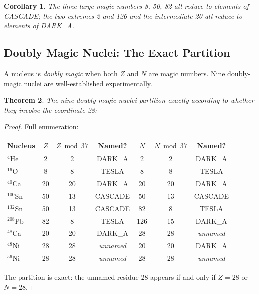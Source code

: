 \documentclass[11pt]{article}
\newtheorem{theorem}{Theorem}
\newtheorem{corollary}[theorem]{Corollary}
\theoremstyle{remark}
\begin{document}
\begin{corollary}
The three large magic numbers 8, 50, 82 all reduce to elements of CASCADE; the
two extremes 2 and 126 and the intermediate 20 all reduce to elements of DARK\_A.
\end{corollary}

\subsection{Doubly Magic Nuclei: The Exact Partition}

A nucleus is \emph{doubly magic} when both $Z$ and $N$ are magic numbers.
Nine doubly-magic nuclei are well-established experimentally.

\begin{theorem}
The nine doubly-magic nuclei partition exactly according to whether they involve
the coordinate 28:
\end{theorem}

\begin{proof}
Full enumeration:
\begin{center}
\begin{tabular}{lcccccc}
\toprule
Nucleus & $Z$ & $Z$ & Named? & $N$ & $N$ & Named?\\
\midrule
${}^{4}$He  & 2  & 2  & DARK\_A & 2   & 2  & DARK\_A \\
${}^{16}$O  & 8  & 8  & TESLA   & 8   & 8  & TESLA   \\
${}^{40}$Ca & 20 & 20 & DARK\_A & 20  & 20 & DARK\_A \\
${}^{100}$Sn& 50 & 13 & CASCADE & 50  & 13 & CASCADE \\
${}^{132}$Sn& 50 & 13 & CASCADE & 82  & 8  & TESLA   \\
${}^{208}$Pb& 82 & 8  & TESLA   & 126 & 15 & DARK\_A \\
\midrule
${}^{48}$Ca & 20 & 20 & DARK\_A & 28  & 28 & \textit{unnamed} \\
${}^{48}$Ni & 28 & 28 & \textit{unnamed} & 20 & 20 & DARK\_A \\
${}^{56}$Ni & 28 & 28 & \textit{unnamed} & 28 & 28 & \textit{unnamed} \\
\bottomrule
\end{tabular}
\end{center}
The partition is exact: the unnamed residue 28 appears if and only if $Z=28$ or $N=28$.
\end{proof}
\end{document}
